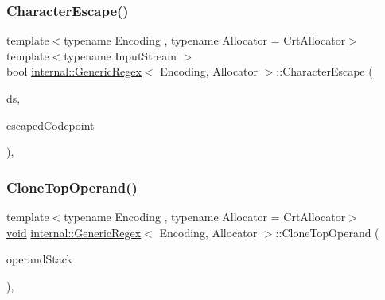 \mbox{\label{classinternal_1_1GenericRegex_ae46593a63a93b8bc34d044800777b72d}} 
\subsubsection{\texorpdfstring{Character\+Escape()}{CharacterEscape()}}
{\footnotesize\ttfamily template$<$typename Encoding , typename Allocator  = Crt\+Allocator$>$ \\
template$<$typename Input\+Stream $>$ \\
bool \hyperlink{classinternal_1_1GenericRegex}{internal\+::\+Generic\+Regex}$<$ Encoding, Allocator $>$\+::Character\+Escape (\begin{DoxyParamCaption}\item[{\hyperlink{classinternal_1_1DecodedStream}{Decoded\+Stream}$<$ Input\+Stream, Encoding $>$ \&}]{ds,  }\item[{unsigned $\ast$}]{escaped\+Codepoint }\end{DoxyParamCaption})\hspace{0.3cm}{\ttfamily [inline]}, {\ttfamily [private]}}

\mbox{\label{classinternal_1_1GenericRegex_a44a907caf47179a3f0edcf46a4be8b2f}} 
\subsubsection{\texorpdfstring{Clone\+Top\+Operand()}{CloneTopOperand()}}
{\footnotesize\ttfamily template$<$typename Encoding , typename Allocator  = Crt\+Allocator$>$ \\
\hyperlink{imgui__impl__opengl3__loader_8h_ac668e7cffd9e2e9cfee428b9b2f34fa7}{void} \hyperlink{classinternal_1_1GenericRegex}{internal\+::\+Generic\+Regex}$<$ Encoding, Allocator $>$\+::Clone\+Top\+Operand (\begin{DoxyParamCaption}\item[{\hyperlink{classinternal_1_1Stack}{Stack}$<$ Allocator $>$ \&}]{operand\+Stack }\end{DoxyParamCaption})\hspace{0.3cm}{\ttfamily [inline]}, {\ttfamily [private]}}


